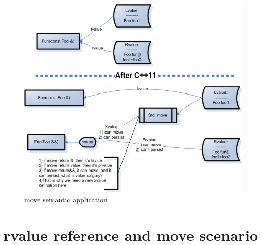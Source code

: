 \documentclass[a4paper,11pt,twoside]{book}
\begin{document}
\begin{itemize}
	
	\begin{figure}[h]
		\centering
		\includegraphics[width=0.7\linewidth]{pics/xvalue.png}
		\caption{move semantic application}
		\label{fig:xvalue}
	\end{figure}	
\end{itemize}

\section{rvalue reference and move scenario}
\end{document}
